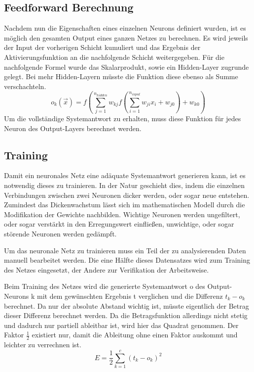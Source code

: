 \subsection{Feedforward Berechnung}
Nachdem nun die Eigenschaften eines einzelnen Neurons definiert wurden, ist es möglich den gesamten Output eines ganzen Netzes zu berechnen.  Es wird jeweils der Input der vorherigen Schicht kumuliert und das Ergebnis der Aktivierungsfunktion an die nachfolgende Schicht weitergegeben. Für die nachfolgende Formel wurde das Skalarprodukt, sowie ein Hidden-Layer zugrunde gelegt. Bei mehr Hidden-Layern müsste die Funktion diese ebenso als Summe verschachteln.
\begin{equation}
o_{k}(\vec{x})=f\left( \sum_{j=1}^{n_{hidden}} w_{kj} f\left(\sum_{i=1}^{n_{input}} w_{ji}x_{i}+w_{j0} \right)+w_{k0} \right)
\end{equation}
Um die vollständige Systemantwort zu erhalten, muss diese Funktion für jedes Neuron des Output-Layers berechnet werden.

\subsection{Training}

Damit ein neuronales Netz eine adäquate Systemantwort generieren kann, ist es notwendig dieses zu trainieren. In der Natur geschieht dies, indem die einzelnen Verbindungen zwischen zwei Neuronen dicker werden, oder sogar neue entstehen. Zumindest das Dickenwachstum lässt sich im mathematischen Modell durch die Modifikation der Gewichte nachbilden. Wichtige Neuronen werden ungefiltert, oder sogar verstärkt in den Erregungswert einfließen, unwichtige, oder sogar störende Neuronen werden gedämpft.

Um das neuronale Netz zu trainieren muss ein Teil der zu analysierenden Daten manuell bearbeitet werden. Die eine Hälfte dieses Datensatzes wird zum Training des Netzes eingesetzt, der Andere zur Verifikation der Arbeitsweise.
 
Beim Training des Netzes wird die generierte Systemantwort o des Output-Neurons k mit dem gewünschten Ergebnis t verglichen und die Differenz $t_k - o_k$ berechnet. Da nur der absolute Abstand wichtig ist, müsste eigentlich der Betrag dieser Differenz berechnet werden. Da die Betragsfunktion allerdings nicht stetig und dadurch nur partiell ableitbar ist, wird hier das Quadrat genommen. Der Faktor $\frac{1}{2}$ existiert nur, damit die Ableitung ohne einen Faktor auskommt und leichter zu verrechnen ist.
\begin{equation}
E = \frac{1}{2} \sum_{k=1}^{c}(t_{k}-o_{k})^2
\end{equation}

